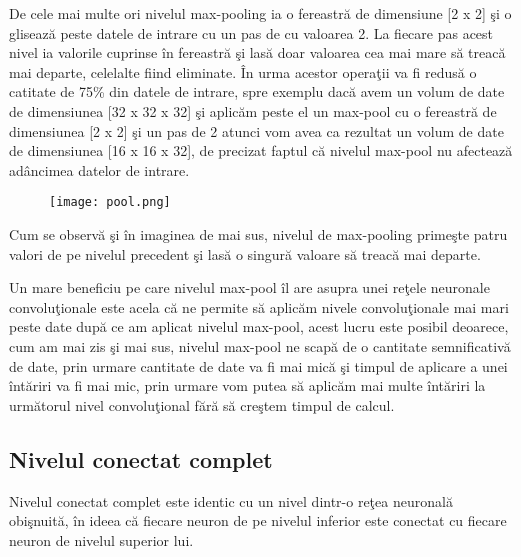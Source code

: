 \par

De cele mai multe ori nivelul max-pooling ia o fereastr\u{a} de dimensiune [2 x 2] \c{s}i o gliseaz\u{a} peste datele de intrare cu un pas de cu valoarea 2. La fiecare pas acest nivel ia valorile cuprinse \^{i}n fereastr\u{a} \c{s}i las\u{a} doar valoarea cea mai mare s\u{a} treac\u{a} mai departe, celelalte fiind eliminate. \^{I}n urma acestor opera\c{t}ii va fi redus\u{a} o catitate de 75\% din datele de intrare, spre exemplu dac\u{a} avem un volum de date de dimensiunea [32 x 32 x 32] \c{s}i aplic\u{a}m peste el un max-pool cu o fereastr\u{a} de dimensiunea [2 x 2] \c{s}i un pas de 2 atunci vom avea ca rezultat un volum de date de dimensiunea [16 x 16 x 32], de precizat faptul c\u{a} nivelul max-pool nu afecteaz\u{a} ad\^{a}ncimea datelor de intrare.

\begin{figure}[h!]
  \centering
  \texttt{[image: pool.png]}
\end{figure}

Cum se observ\u{a} \c{s}i \^{i}n imaginea de mai sus, nivelul de max-pooling prime\c{s}te patru valori de pe nivelul precedent \c{s}i las\u{a} o singur\u{a} valoare s\u{a} treac\u{a} mai departe.

Un mare beneficiu pe care nivelul max-pool \^{i}l are asupra unei re\c{t}ele neuronale convolu\c{t}ionale este acela c\u{a} ne permite s\u{a} aplic\u{a}m nivele convolu\c{t}ionale mai mari peste date dup\u{a} ce am aplicat nivelul max-pool, acest lucru este posibil deoarece, cum am mai zis \c{s}i mai sus, nivelul max-pool ne scap\u{a} de o cantitate semnificativ\u{a} de date, prin urmare cantitate de date va fi mai mic\u{a} \c{s}i timpul de aplicare a unei \^{i}nt\u{a}riri va fi mai mic, prin urmare vom putea s\u{a} aplic\u{a}m mai multe \^{i}nt\u{a}riri la urm\u{a}torul nivel convolu\c{t}ional f\u{a}r\u{a} s\u{a} cre\c{s}tem timpul de calcul.

\subsection{Nivelul conectat complet}

Nivelul conectat complet este identic cu un nivel dintr-o re\c{t}ea neuronal\u{a} obi\c{s}nuit\u{a}, \^{i}n ideea c\u{a} fiecare neuron de pe nivelul inferior este conectat cu fiecare neuron de nivelul superior lui.

\par

